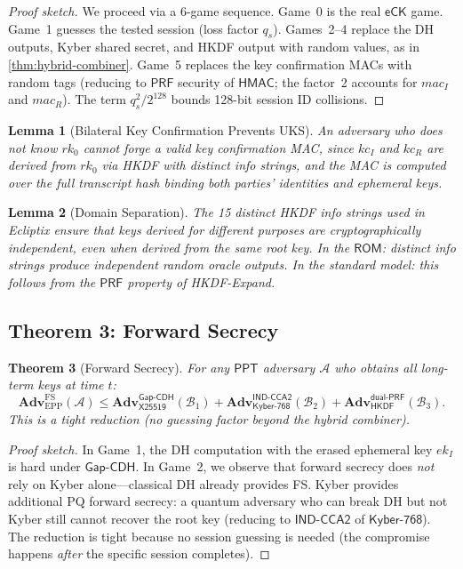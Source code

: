 \documentclass[11pt,a4paper]{article}
\newtheorem{theorem}{Theorem}[section]
\newtheorem{lemma}[theorem]{Lemma}
\theoremstyle{definition}
\newcommand{\ppt}{\mathsf{PPT}}
\newcommand{\adv}{\mathbf{Adv}}
\newcommand{\advA}{\mathcal{A}}
\newcommand{\advB}{\mathcal{B}}
\newcommand{\HKDF}{\textsf{HKDF}}
\newcommand{\HMAC}{\textsf{HMAC}}
\newcommand{\DH}{\textsf{X25519}}
\newcommand{\KEM}{\textsf{Kyber-768}}
\newcommand{\GapCDH}{\textsf{Gap-CDH}}
\newcommand{\INDCCA}{\textsf{IND-CCA2}}
\newcommand{\PRF}{\textsf{PRF}}
\newcommand{\dualPRF}{\textsf{dual-PRF}}
\newcommand{\ROM}{\textsf{ROM}}
\newcommand{\eCK}{\textsf{eCK}}
\newcommand{\rk}{\mathit{rk}}
\begin{document}
\begin{proof}[Proof sketch]
We proceed via a 6-game sequence. Game~0 is the real $\eCK$ game. Game~1 guesses the tested session (loss factor $q_s$). Games~2--4 replace the DH outputs, Kyber shared secret, and HKDF output with random values, as in \cref{thm:hybrid-combiner}. Game~5 replaces the key confirmation MACs with random tags (reducing to $\PRF$ security of $\HMAC$; the factor~2 accounts for $\mathit{mac}_I$ and $\mathit{mac}_R$). The term $q_s^2/2^{128}$ bounds 128-bit session ID collisions.
\end{proof}

\begin{lemma}[Bilateral Key Confirmation Prevents UKS]\label{lem:key-confirm}
An adversary who does not know $\rk_0$ cannot forge a valid key confirmation MAC, since $\mathit{kc}_I$ and $\mathit{kc}_R$ are derived from $\rk_0$ via HKDF with distinct info strings, and the MAC is computed over the full transcript hash binding both parties' identities and ephemeral keys.
\end{lemma}

\begin{lemma}[Domain Separation]\label{lem:domain-sep}
The 15 distinct HKDF info strings used in Ecliptix ensure that keys derived for different purposes are cryptographically independent, even when derived from the same root key. In the $\ROM$: distinct info strings produce independent random oracle outputs. In the standard model: this follows from the $\PRF$ property of HKDF-Expand.
\end{lemma}

\subsection{Theorem 3: Forward Secrecy}

\begin{theorem}[Forward Secrecy]\label{thm:fs}
For any $\ppt$ adversary $\advA$ who obtains all long-term keys at time $t$:
\[
  \adv^{\mathrm{FS}}_{\mathrm{EPP}}(\advA) \leq \adv^{\GapCDH}_{\DH}(\advB_1) + \adv^{\INDCCA}_{\KEM}(\advB_2) + \adv^{\dualPRF}_{\HKDF}(\advB_3).
\]
This is a \emph{tight} reduction (no guessing factor beyond the hybrid combiner).
\end{theorem}

\begin{proof}[Proof sketch]
In Game~1, the DH computation with the erased ephemeral key $\mathit{ek}_I$ is hard under $\GapCDH$. In Game~2, we observe that forward secrecy does \emph{not} rely on Kyber alone---classical DH already provides FS. Kyber provides additional PQ forward secrecy: a quantum adversary who can break DH but not Kyber still cannot recover the root key (reducing to $\INDCCA$ of $\KEM$). The reduction is tight because no session guessing is needed (the compromise happens \emph{after} the specific session completes).
\end{proof}
\end{document}
